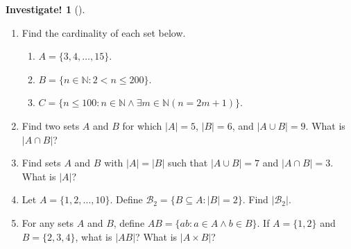 \documentclass[10pt,]{book}
\theoremstyle{plain}
\theoremstyle{definition}
\theoremstyle{definition}
\theoremstyle{definition}
\newtheorem{investigation}[project]{Investigate!}
\theoremstyle{definition}
\numberwithin{equation}{chapter}
\def\N{\mathbb N}
\def\st{:}
\newcommand{\lt}{<}
\begin{document}
\begin{investigation}[]\label{investigation-12}
\hypertarget{p-1583}{}%
%
\begin{enumerate}
\item\hypertarget{li-432}{}\hypertarget{p-1584}{}%
Find the cardinality of each set below. %
\begin{enumerate}
\item\hypertarget{li-433}{}\(A = \{3,4,\ldots, 15\}\).%
\item\hypertarget{li-434}{}\(B = \{n \in \N \st 2 \lt  n \le 200\}\).%
\item\hypertarget{li-435}{}\(C = \{n \le 100 \st n \in \N \wedge \exists m \in \N (n = 2m+1)\}\).%
\end{enumerate}
%
\item\hypertarget{li-436}{}\hypertarget{p-1585}{}%
Find two sets \(A\) and \(B\) for which \(|A| = 5\), \(|B| = 6\), and \(|A\cup B| = 9\). What is \(|A \cap B|\)?%
\item\hypertarget{li-437}{}\hypertarget{p-1586}{}%
Find sets \(A\) and \(B\) with \(|A| = |B|\) such that \(|A\cup B| = 7\) and \(|A \cap B| = 3\). What is \(|A|\)?%
\item\hypertarget{li-438}{}\hypertarget{p-1587}{}%
Let \(A = \{1,2,\ldots, 10\}\). Define \(\mathcal{B}_2 = \{B \subseteq A \st |B| = 2\}\). Find \(|\mathcal{B}_2|\).%
\item\hypertarget{li-439}{}For any sets \(A\) and \(B\), define \(AB = \{ab \st a\in A \wedge b \in B\}\). If \(A = \{1,2\}\) and \(B = \{2,3,4\}\), what is \(|AB|\)? What is \(|A \times B|\)?%
\end{enumerate}
%
\end{investigation}
\typeout{************************************************}
\typeout{************************************************}
\end{document}
